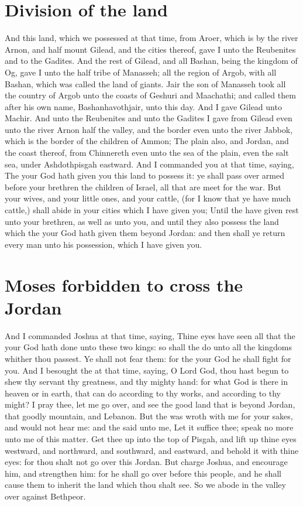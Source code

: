 \begin{biblechapter}
\section*{Division of the land}
\verse And this land, which we possessed at that time, from Aroer, which is by the river Arnon, and half mount Gilead, and the cities thereof, gave I unto the Reubenites and to the Gadites.
\verse And the rest of Gilead, and all Bashan, being the kingdom of Og, gave I unto the half tribe of Manasseh; all the region of Argob, with all Bashan, which was called the land of giants.
\verse Jair the son of Manasseh took all the country of Argob unto the coasts of Geshuri and Maachathi; and called them after his own name, Bashanhavothjair, unto this day.
\verse And I gave Gilead unto Machir.
\verse And unto the Reubenites and unto the Gadites I gave from Gilead even unto the river Arnon half the valley, and the border even unto the river Jabbok, which is the border of the children of Ammon;
\verse The plain also, and Jordan, and the coast thereof, from Chinnereth even unto the sea of the plain, even the salt sea, under Ashdothpisgah eastward.
\verse And I commanded you at that time, saying, The \LORD your God hath given you this land to possess it: ye shall pass over armed before your brethren the children of Israel, all that are meet for the war.
\verse But your wives, and your little ones, and your cattle, (for I know that ye have much cattle,) shall abide in your cities which I have given you;
\verse Until the \LORD have given rest unto your brethren, as well as unto you, and until they also possess the land which the \LORD your God hath given them beyond Jordan: and then shall ye return every man unto his possession, which I have given you.
\section*{Moses forbidden to cross the Jordan}
\verse And I commanded Joshua at that time, saying, Thine eyes have seen all that the \LORD your God hath done unto these two kings: so shall the \LORD do unto all the kingdoms whither thou passest.
\verse Ye shall not fear them: for the \LORD your God he shall fight for you.
\verse And I besought the \LORD at that time, saying,
\verse O Lord God, thou hast begun to shew thy servant thy greatness, and thy mighty hand: for what God is there in heaven or in earth, that can do according to thy works, and according to thy might?
\verse I pray thee, let me go over, and see the good land that is beyond Jordan, that goodly mountain, and Lebanon.
\verse But the \LORD was wroth with me for your sakes, and would not hear me: and the \LORD said unto me, Let it suffice thee; speak no more unto me of this matter.
\verse Get thee up into the top of Pisgah, and lift up thine eyes westward, and northward, and southward, and eastward, and behold it with thine eyes: for thou shalt not go over this Jordan.
\verse But charge Joshua, and encourage him, and strengthen him: for he shall go over before this people, and he shall cause them to inherit the land which thou shalt see.
\verse So we abode in the valley over against Bethpeor.
\end{biblechapter}


